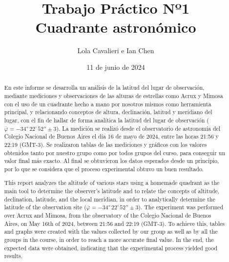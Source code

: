 \documentclass[11pt, a4paper]{article} %
\title{Trabajo Práctico Nº1 \\ Cuadrante astronómico}
\author{Lola Cavalieri e Ian Chen}
\date{11 de junio de 2024}
\begin{document}
\maketitle
\onehalfspacing
\vspace{1cm}
\begin{abstract}
  En este informe se desarrolla un análisis de la latitud del lugar de observación, mediante mediciones y observaciones de las alturas de estrellas como Acrux y Mimosa con el uso de un cuadrante hecho a mano por nosotros mismos como herramienta principal, y relacionando conceptos de altura, declinación, latitud y meridiano del lugar, con el fin de hallar de forma analítica la latitud del lugar de observación ($\overline{\varphi} = -\ang{34} \,22\text{'}\, 52\text{''} \pm 3$). La medición se realizó desde el observatorio de astronomía del Colegio Nacional de Buenos Aires el día 16 de mayo de 2024, entre las horas 21:56 y 22:19 (GMT-3). Se realizaron tablas de las mediciones y gráficos con los valores obtenidos tanto por nuestro grupo como por todos grupos del curso, para conseguir un valor final más exacto. Al final se obtuvieron los datos esperados desde un principio, por lo que se considera que el proceso experimental obtuvo un buen resultado.
\end{abstract}

\begin{abstract}
This report analyzes the altitude of various stars using a homemade quadrant as the main tool to determine the observer's latitude and to relate the concepts of altitude, declination, latitude, and the local meridian, in order to analytically determine the latitude of the observation site ($\overline{\varphi} = -\ang{34} \,22\text{'}\, 52\text{''} \pm 3$). The experiment was performed over Acrux and Mimosa, from the observatory of the Colegio Nacional de Buenos Aires, on May 16th of 2024, between 21:56 and 22:19 (GMT-3).  To achieve this, tables and graphs were created with the values collected by our group as well as by all the groups in the course, in order to reach a more accurate final value. In the end, the expected data were obtained, indicating that the experimental process yielded good results.
\end{abstract}

\newpage


\end{document}
